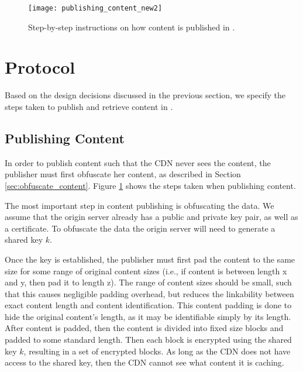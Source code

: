 \begin{figure}[t!]
\centering
\texttt{[image: publishing\_content\_new2]}
\caption{Step-by-step instructions on how content is published in \system{}.}
\label{fig:publishing}
\end{figure}

\section{\system{} Protocol}
\label{sec:protocol}
Based on the design decisions discussed in the previous section, we specify the 
steps taken to publish and retrieve content in \system{}.

\subsection{Publishing Content}
\label{sec:publish_protocol}
In order to publish content such that the CDN never sees the content, the publisher 
must first obfuscate her content, as described in Section \ref{sec:obfuscate_content}. 
Figure \ref{fig:publishing} shows the steps taken when publishing content.


The most important step in content publishing is obfuscating the data.  We assume that the origin 
server already has a public and private key pair, as well as a certificate.  To obfuscate the data 
the origin server will need to generate a shared key $k$. 

Once the key is established, the publisher must first pad the content to the same size for some 
range of original content sizes (i.e., if content is between length x and y, then pad it to length 
z).  The range of content sizes should be small, such that this causes negligible padding overhead, but 
reduces the linkability between exact content length and content identification.  This content padding 
is done to hide the original content's length, as it may be identifiable simply by its length.  After 
content is padded, then the content is divided into fixed size blocks and padded to 
some standard length.  Then each block is encrypted using the shared key $k$, 
resulting in a set of encrypted blocks. As long as the CDN does not have access to the shared key, 
then the CDN cannot see what content it is caching.  

